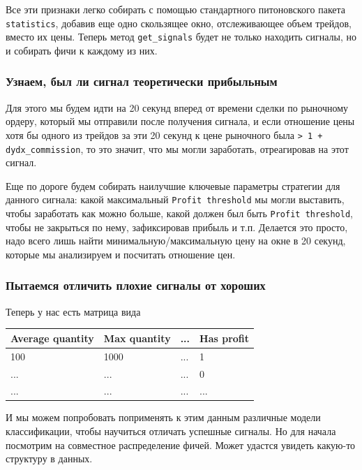 Все эти признаки легко собирать с помощью стандартного питоновского пакета \texttt{statistics}, добавив еще одно скользящее окно, отслеживающее объем трейдов, вместо их цены. Теперь метод \texttt{get\_signals} будет не только находить сигналы, но и собирать фичи к каждому из них.

\subsubsection{Узнаем, был ли сигнал теоретически прибыльным}
Для этого мы будем идти на 20 секунд вперед от времени сделки по рыночному ордеру, который мы отправили после получения сигнала, и если отношение цены хотя бы одного из трейдов за эти 20 секунд к цене рыночного была \texttt{> 1 + dydx\_commission}, то это значит, что мы могли заработать, отреагировав на этот сигнал. 

Еще по дороге будем собирать наилучшие ключевые параметры стратегии для данного сигнала: какой максимальный \texttt{Profit threshold} мы могли выставить, чтобы заработать как можно больше, какой должен был быть \texttt{Profit threshold}, чтобы не закрыться по нему, зафиксировав прибыль и т.п. Делается это просто, надо всего лишь найти минимальную/максимальную цену на окне в 20 секунд, которые мы анализируем и посчитать отношение цен.

\subsubsection{Пытаемся отличить плохие сигналы от хороших}
        Теперь у нас есть матрица вида

\begin{table}[h]
    \centering
    \begin{tabular}[t]{ | l | l | l | l | }
    \hline
    Average quantity & Max quantity & ... & Has profit \\ \hline
    100 & 1000 & ... & 1 \\
    ... & ... & ... & 0 \\
    ... & ... & ... & ... \\
    \hline
    \end{tabular}
    \label{table:satellites}
\end{table}

И мы можем попробовать поприменять к этим данным различные модели классификации, чтобы научиться отличать успешные сигналы. Но для начала посмотрим на совместное распределение фичей. Может удастся увидеть какую-то структуру в данных. 

